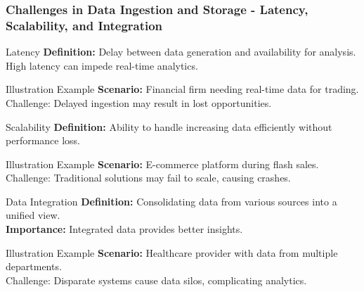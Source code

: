 \documentclass[aspectratio=169]{beamer}
\begin{document}
\begin{frame}[fragile]
    \frametitle{Challenges in Data Ingestion and Storage - Latency, Scalability, and Integration}
    \begin{block}{Latency}
        \textbf{Definition:} Delay between data generation and availability for analysis.\\
        High latency can impede real-time analytics.
    \end{block}
    \begin{exampleblock}{Illustration Example}
        \textbf{Scenario:} Financial firm needing real-time data for trading.\\
        Challenge: Delayed ingestion may result in lost opportunities.
    \end{exampleblock}
    
    \begin{block}{Scalability}
        \textbf{Definition:} Ability to handle increasing data efficiently without performance loss.\\
    \end{block}
    \begin{exampleblock}{Illustration Example}
        \textbf{Scenario:} E-commerce platform during flash sales.\\
        Challenge: Traditional solutions may fail to scale, causing crashes.
    \end{exampleblock}
    
    \begin{block}{Data Integration}
        \textbf{Definition:} Consolidating data from various sources into a unified view.\\
        \textbf{Importance:} Integrated data provides better insights.
    \end{block}
    \begin{exampleblock}{Illustration Example}
        \textbf{Scenario:} Healthcare provider with data from multiple departments.\\
        Challenge: Disparate systems cause data silos, complicating analytics.
    \end{exampleblock}
\end{frame}
\end{document}
